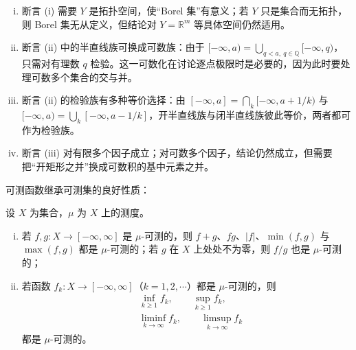 \documentclass[../../main.tex]{subfiles}
\begin{document}
\begin{remark}\label{remark:ch01-thm-1-10-条件}
\begin{enumerate}[(i)]
\item 断言 (i) 需要 $Y$ 是拓扑空间，使“Borel 集”有意义；若 $Y$ 只是集合而无拓扑，则 Borel 集无从定义，但结论对 $Y=\mathbb{R}^{m}$ 等具体空间仍然适用。
\item 断言 (ii) 中的半直线族可换成可数族：由于 $[-\infty,a)=\bigcup_{q<a,\ q\in\mathbb{Q}}[-\infty,q)$，只需对有理数 $q$ 检验。这一可数化在讨论逐点极限时是必要的，因为此时要处理可数多个集合的交与并。
\item 断言 (ii) 的检验族有多种等价选择：由 $[-\infty,a]=\bigcap_{k}[-\infty,a+1/k)$ 与 $[-\infty,a)=\bigcup_{k}[-\infty,a-1/k]$，开半直线族与闭半直线族彼此等价，两者都可作为检验族。
\item 断言 (iii) 对有限多个因子成立；对可数多个因子，结论仍然成立，但需要把“开矩形之并”换成可数积的基中元素之并。
\end{enumerate}
\end{remark}

可测函数继承可测集的良好性质：

\begin{theorem}[可测函数的性质]\label{theorem:ch01-1-11}
设 $X$ 为集合，$\mu$ 为 $X$ 上的测度。
\begin{enumerate}[(i)]
\item 若 $f,g:X\to[-\infty,\infty]$ 是 $\mu$-可测的，则 $f+g$、$fg$、$|f|$、$\min(f,g)$ 与 $\max(f,g)$ 都是 $\mu$-可测的；若 $g$ 在 $X$ 上处处不为零，则 $f/g$ 也是 $\mu$-可测的；
\item 若函数 $f_{k}:X\to[-\infty,\infty]$（$k=1,2,\cdots$）都是 $\mu$-可测的，则
\begin{align*}
&\inf_{k\geqslant1}f_{k},\qquad\sup_{k\geqslant1}f_{k},\\
&\liminf_{k\to\infty}f_{k},\qquad\limsup_{k\to\infty}f_{k}
\end{align*}
都是 $\mu$-可测的。
\end{enumerate}
\end{theorem}
\end{document}
